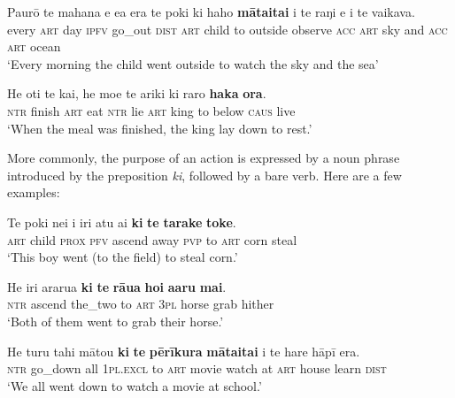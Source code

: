 \ea\label{ex:11.244}
\gll Paurō te mahana e e{\ꞌ}a era te poki ki haho \textbf{māta{\ꞌ}ita{\ꞌ}i} i te raŋi  {\ꞌ}e i te vaikava.\\
every \textsc{art} day \textsc{ipfv} go\_out \textsc{dist} \textsc{art} child to outside observe \textsc{acc} \textsc{art} sky  and \textsc{acc} \textsc{art} ocean\\

\glt 
‘Every morning the child went outside to watch the sky and the sea’ \textstyleExampleref{[R532-07.004]}
\z

\ea\label{ex:11.245}
\gll He oti te kai, he moe te {\ꞌ}ariki ki raro \textbf{haka} \textbf{ora}. \\
\textsc{ntr} finish \textsc{art} eat \textsc{ntr} lie \textsc{art} king to below \textsc{caus} live \\

\glt
‘When the meal was finished, the king lay down to rest.’ \textstyleExampleref{[Ley-2-10.017]}
\z

More commonly, the purpose of an action is expressed by a noun phrase introduced by the preposition \textit{ki}, followed by a bare verb. Here are a few examples:

\ea\label{ex:11.246}
\gll Te poki nei i iri atu ai \textbf{ki} \textbf{te} \textbf{tarake} \textbf{toke}. \\
\textsc{art} child \textsc{prox} \textsc{pfv} ascend away \textsc{pvp} to \textsc{art} corn steal \\

\glt 
‘This boy went (to the field) to steal corn.’ \textstyleExampleref{[R132.003]} 
\z

\ea\label{ex:11.247}
\gll He iri ararua \textbf{ki} \textbf{te} \textbf{rāua} \textbf{hoi} \textbf{{\ꞌ}a{\ꞌ}aru} \textbf{mai}.\\
\textsc{ntr} ascend the\_two to \textsc{art} \textsc{3pl} horse grab hither\\

\glt 
‘Both of them went to grab their horse.’ \textstyleExampleref{[R170.002]} 
\z

\ea\label{ex:11.248}
\gll He turu tahi mātou \textbf{ki} \textbf{te} \textbf{pērīkura} \textbf{māta{\ꞌ}ita{\ꞌ}i} {\ꞌ}i te hare hāpī era. \\
\textsc{ntr} go\_down all \textsc{1pl.excl} to \textsc{art} movie watch at \textsc{art} house learn \textsc{dist} \\

\glt
‘We all went down to watch a movie at school.’ \textstyleExampleref{[R410.010]} 
\z

